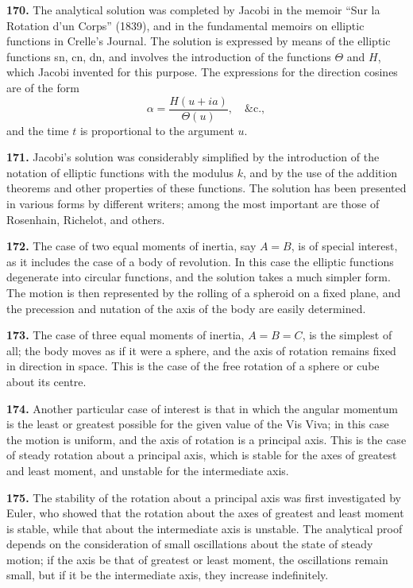 \documentclass[11pt,a4paper]{article}
\theoremstyle{definition}
\begin{document}
\textbf{170.} The analytical solution was completed by Jacobi in the memoir ``Sur la Rotation d'un Corps'' (1839), and in the fundamental memoirs on elliptic functions in Crelle's Journal. The solution is expressed by means of the elliptic functions sn, cn, dn, and involves the introduction of the functions $\Theta$ and $H$, which Jacobi invented for this purpose. The expressions for the direction cosines are of the form
\[
\alpha = \frac{H(u + ia)}{\Theta(u)}, \quad \&\text{c.},
\]
and the time $t$ is proportional to the argument $u$.

\textbf{171.} Jacobi's solution was considerably simplified by the introduction of the notation of elliptic functions with the modulus $k$, and by the use of the addition theorems and other properties of these functions. The solution has been presented in various forms by different writers; among the most important are those of Rosenhain, Richelot, and others.

\textbf{172.} The case of two equal moments of inertia, say $A = B$, is of special interest, as it includes the case of a body of revolution. In this case the elliptic functions degenerate into circular functions, and the solution takes a much simpler form. The motion is then represented by the rolling of a spheroid on a fixed plane, and the precession and nutation of the axis of the body are easily determined.

\textbf{173.} The case of three equal moments of inertia, $A = B = C$, is the simplest of all; the body moves as if it were a sphere, and the axis of rotation remains fixed in direction in space. This is the case of the free rotation of a sphere or cube about its centre.

\textbf{174.} Another particular case of interest is that in which the angular momentum is the least or greatest possible for the given value of the Vis Viva; in this case the motion is uniform, and the axis of rotation is a principal axis. This is the case of steady rotation about a principal axis, which is stable for the axes of greatest and least moment, and unstable for the intermediate axis.

\textbf{175.} The stability of the rotation about a principal axis was first investigated by Euler, who showed that the rotation about the axes of greatest and least moment is stable, while that about the intermediate axis is unstable. The analytical proof depends on the consideration of small oscillations about the state of steady motion; if the axis be that of greatest or least moment, the oscillations remain small, but if it be the intermediate axis, they increase indefinitely.
\end{document}
